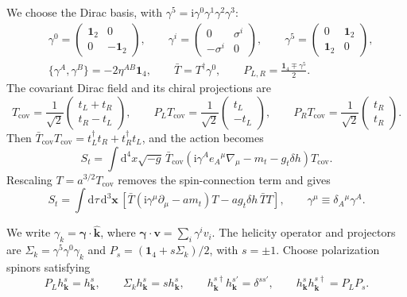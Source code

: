 \documentclass[a4paper,12pt]{article}
\def\di{{\mathrm{d}}}
\def\mb{\mathbf}
\def\ii{\mathrm{i}}
\begin{document}
We choose the Dirac basis, with $\gamma^5=\ii\gamma^0\gamma^1\gamma^2\gamma^3$:
\begin{align}
 &\gamma^0=\begin{pmatrix}\mathbf1_2&0\\0&-\mathbf1_2\end{pmatrix},\qquad
 \gamma^i=\begin{pmatrix}0&\sigma^i\\-\sigma^i&0\end{pmatrix},\qquad
 \gamma^5=\begin{pmatrix}0&\mathbf1_2\\\mathbf1_2&0\end{pmatrix},
 \nonumber\\
 &\{\gamma^A,\gamma^B\}=-2\eta^{AB}\mathbf1_4,\qquad
 \bar T=T^\dagger\gamma^0,\qquad
 P_{L,R}=\frac{\mathbf1_4\mp\gamma^5}{2}.
 \label{eq:dirac-clifford}
\end{align}
The covariant Dirac field and its chiral projections are
\begin{equation}
 T_{\mathrm{cov}}=\frac1{\sqrt2}
 \begin{pmatrix}t_L+t_R\\t_R-t_L\end{pmatrix},\qquad
 P_LT_{\mathrm{cov}}=\frac1{\sqrt2}\begin{pmatrix}t_L\\-t_L\end{pmatrix},\qquad
 P_RT_{\mathrm{cov}}=\frac1{\sqrt2}\begin{pmatrix}t_R\\t_R\end{pmatrix}.
 \label{eq:dirac-field}
\end{equation}
Then $\bar T_{\mathrm{cov}}T_{\mathrm{cov}} =t_L^\dagger t_R+t_R^\dagger t_L$, and the action becomes
\begin{equation}
 S_t=\int\di^4x\sqrt{-g}\,
 \bar T_{\mathrm{cov}}
 \left(\ii\gamma^Ae_A{}^\mu\nabla_\mu-m_t-g_t\delta h\right)
 T_{\mathrm{cov}}.
 \label{eq:dirac-covariant-action}
\end{equation}
Rescaling $T=a^{3/2}T_{\mathrm{cov}}$ removes the spin-connection term and gives
\begin{equation}
 S_t=\int\di\tau\,\di^3\mb x\,
 \left[\bar T(\ii\gamma^\mu\partial_\mu-a m_t)T
       -a g_t\delta h\,\bar T T\right],
 \qquad \gamma^\mu\equiv\delta_A{}^\mu\gamma^A.
 \label{eq:dirac-rescaled-action}
\end{equation}

We write $\gamma_k=\bm\gamma\cdot\widehat{\mb k}$, where $\bm\gamma\cdot\mb v=\sum_i\gamma^iv_i$.
The helicity operator and projectors are $\Sigma_k=\gamma^5\gamma^0\gamma_k$ and $P_s=(\mathbf1_4+s\Sigma_k)/2$, with $s=\pm1$.
Choose polarization spinors satisfying
\begin{equation}
 P_Lh^s_{\mb k}=h^s_{\mb k},\qquad
 \Sigma_kh^s_{\mb k}=s h^s_{\mb k},\qquad
 h^{s\dagger}_{\mb k}h^{s'}_{\mb k}=\delta^{ss'},\qquad
 h^s_{\mb k}h^{s\dagger}_{\mb k}=P_LP_s.
 \label{eq:dirac-polarizations}
\end{equation}
\end{document}
